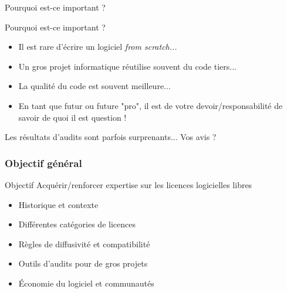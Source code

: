 \documentclass{beamer}
\begin{document}
\begin{frame}[plain]%
%  
\end{frame}


\begin{frame}[plain]%
%  
\end{frame}

\begin{frame}[plain]%
%  
\end{frame}

\begin{frame}{Pourquoi est-ce important ?}
  \begin{alertblock}{Pourquoi est-ce important ?}
    \begin{itemize}
    \item Il est rare d'écrire un logiciel \emph{from scratch...}
    \item Un gros projet informatique réutilise souvent du code
      tiers...
    \item La qualité du code est souvent meilleure...
    \item En tant que futur ou future "pro", il est de votre
      devoir/responsabilité de savoir de quoi il est question !
    \end{itemize}


  \end{alertblock}

  Les résultats d'audits sont parfois surprenants... Vos avis ?

\end{frame}


\begin{frame}
\frametitle{Objectif g\'en\'eral}
\begin{alertblock}{Objectif}
  Acquérir/renforcer expertise sur les licences logicielles libres
\end{alertblock}


  \begin{itemize}
  \item Historique et contexte
  \item Différentes catégories de licences
  \item Règles de diffusivité et compatibilité
  \item Outils d'audits pour de gros projets
  \item Économie du logiciel et communautés
  \end{itemize}
\end{frame}
\end{document}
